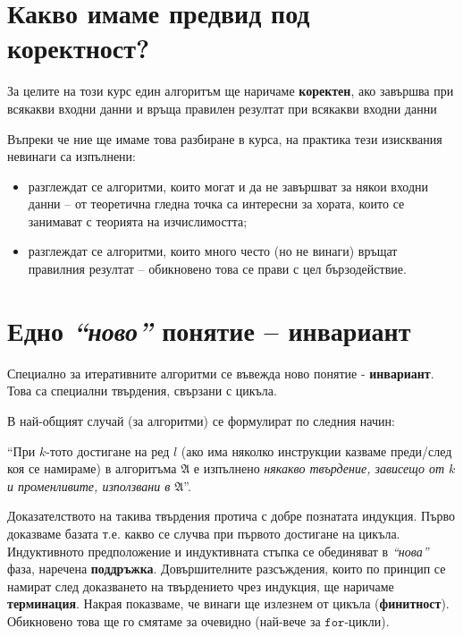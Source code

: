 \section{Какво имаме предвид под коректност?}

За целите на този курс един алгоритъм ще наричаме \textbf{коректен}, ако завършва при всякакви входни данни и връща правилен резултат при всякакви входни данни

\begin{remark}
    Въпреки че ние ще имаме това разбиране в курса, на практика тези изисквания невинаги са изпълнени:
    \begin{itemize}
        \item разглеждат се алгоритми, които могат и да не завършват за някои входни данни -- от теоретична гледна точка са интересни за хората, които се занимават с теорията на изчислимостта;
        \item разглеждат се алгоритми, които много често (но не винаги) връщат правилния резултат -- обикновено това се прави с цел бързодействие.
    \end{itemize}
\end{remark}

\section{Едно \textit{``ново''} понятие -- инвариант}

Специално за итеративните алгоритми се въвежда ново понятие - \textbf{инвариант}.
Това са специални твърдения, свързани с цикъла.

В най-общият случай (за алгоритми) се формулират по следния начин:
\begin{center}
    ``При $k$-тото достигане на ред $l$ (ако има няколко инструкции казваме преди/след коя се намираме) в алгоритъма $\mathfrak{A}$ е изпълнено \textit{някакво твърдение, зависещо от $k$ и променливите, използвани в $\mathfrak{A}$}''.
\end{center}
Доказателството на такива твърдения протича с добре познатата индукция.
Първо доказваме базата т.е. какво се случва при първото достигане на цикъла.
Индуктивното предположение и индуктивната стъпка се обединяват в \textit{``нова''} фаза, наречена \textbf{поддръжка}.
Довършителните разсъждения, които по принцип се намират след доказването на твърдението чрез индукция, ще наричаме \textbf{терминация}.
Накрая показваме, че винаги ще излезнем от цикъла (\textbf{финитност}).
Обикновено това ще го смятаме за очевидно (най-вече за $\mathtt{for}$-цикли).

